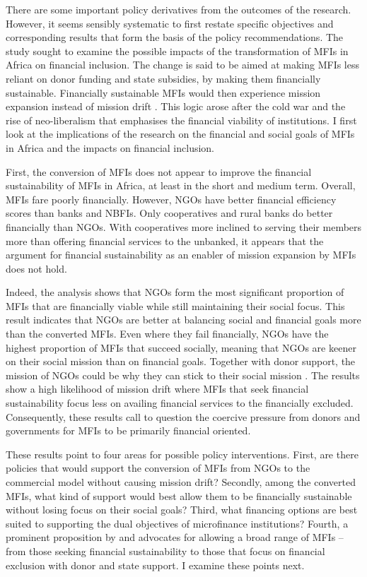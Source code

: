 \documentclass[a4paper, nobind]{templates/ociamthesis}
\begin{document}
There are some important policy derivatives from the outcomes of the research. However, it seems sensibly systematic to first restate specific objectives and corresponding results that form the basis of the policy recommendations. The study sought to examine the possible impacts of the transformation of MFIs in Africa on financial inclusion. The change is said to be aimed at making MFIs less reliant on donor funding and state subsidies, by making them financially sustainable. Financially sustainable MFIs would then experience mission expansion instead of mission drift \autocite{mersland2010microfinance}. This logic arose after the cold war and the rise of neo-liberalism that emphasises the financial viability of institutions. I first look at the implications of the research on the financial and social goals of MFIs in Africa and the impacts on financial inclusion.

First, the conversion of MFIs does not appear to improve the financial sustainability of MFIs in Africa, at least in the short and medium term. Overall, MFIs fare poorly financially. However, NGOs have better financial efficiency scores than banks and NBFIs. Only cooperatives and rural banks do better financially than NGOs. With cooperatives more inclined to serving their members more than offering financial services to the unbanked, it appears that the argument for financial sustainability as an enabler of mission expansion by MFIs does not hold.

Indeed, the analysis shows that NGOs form the most significant proportion of MFIs that are financially viable while still maintaining their social focus. This result indicates that NGOs are better at balancing social and financial goals more than the converted MFIs. Even where they fail financially, NGOs have the highest proportion of MFIs that succeed socially, meaning that NGOs are keener on their social mission than on financial goals. Together with donor support, the mission of NGOs could be why they can stick to their social mission \autocite{berbegal2019impact}. The results show a high likelihood of mission drift where MFIs that seek financial sustainability focus less on availing financial services to the financially excluded. Consequently, these results call to question the coercive pressure from donors and governments for MFIs to be primarily financial oriented.

These results point to four areas for possible policy interventions. First, are there policies that would support the conversion of MFIs from NGOs to the commercial model without causing mission drift? Secondly, among the converted MFIs, what kind of support would best allow them to be financially sustainable without losing focus on their social goals? Third, what financing options are best suited to supporting the dual objectives of microfinance institutions? Fourth, a prominent proposition by \textcite{morduch1999microfinance} and \textcite{morduch2000microfinance} advocates for allowing a broad range of MFIs -- from those seeking financial sustainability to those that focus on financial exclusion with donor and state support. I examine these points next.
\end{document}
